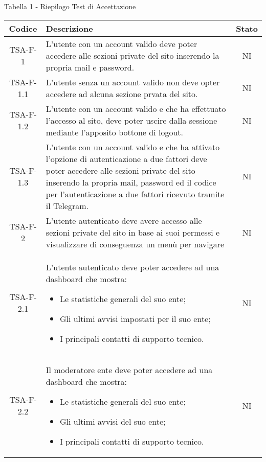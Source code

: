 		\begin{center}
		Tabella 1 - Riepilogo Test di Accettazione
			\begin{longtable}{|c|p{10cm}|c|}
			\hline
			\rowcolor{lighter-grayer}
			\textbf{Codice} & \textbf{Descrizione} & \textbf{Stato} \\
			\hline
			\endfirsthead

			\hline
			 TSA-F-1 & L'utente con un account valido deve poter accedere alle sezioni private del sito inserendo la propria mail e password.
			  & NI \\
			 \hline
			 TSA-F-1.1 & L'utente senza un account valido non deve opter accedere ad alcuna sezione prvata del sito. & NI \\
			 \hline
			 TSA-F-1.2 & L'utente con un account valido e che ha effettuato l'accesso al sito, deve poter uscire dalla sessione mediante l'apposito bottone di logout. & NI \\
			 \hline
			 TSA-F-1.3 & L'utente con un account valido e che ha attivato l'opzione di autenticazione a due fattori deve poter accedere alle sezioni private del sito inserendo la propria mail, password ed il codice per l'autenticazione a due fattori ricevuto tramite il Telegram. & NI \\
			 \hline
			 TSA-F-2 & L'utente autenticato deve avere accesso alle sezioni private del sito in base ai suoi permessi e visualizzare di conseguenza un menù per navigare & NI \\
			 \hline
			 TSA-F-2.1 & L'utente autenticato deve poter accedere ad una dashboard che mostra:
			 \begin{itemize}
			 	\item Le statistiche generali del suo ente;
			 	\item Gli ultimi avvisi impostati per il suo ente;
			 	\item I principali contatti di supporto tecnico.
			 \end{itemize} & NI \\
			 \hline
			 TSA-F-2.2 & Il moderatore ente deve poter accedere ad una dashboard che mostra:
			 \begin{itemize}
			 	\item Le statistiche generali del suo ente;
			 	\item Gli ultimi avvisi del suo ente;
			 	\item I principali contatti di supporto tecnico.
			 \end{itemize} & NI \\

\end{longtable}
\end{center}

